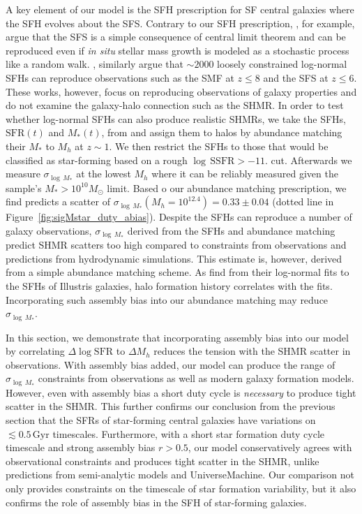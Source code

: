 \documentclass[12pt, letterpaper, preprint, tighten]{aastex62}
\newcommand{\logsfr}{\log\mathrm{SFR}}
\begin{document}
A key element of our model is the SFH prescription for SF central galaxies where 
the SFH evolves about the SFS. Contrary to our SFH prescription, \cite{kelson2014}, 
for example, argue that the SFS is a simple consequence of central limit theorem 
and can be reproduced even if \emph{in situ} stellar mass growth is modeled as 
a stochastic process like a random walk. \cite{gladders2013,abramson2015,abramson2016}, 
similarly argue that $\sim2000$ loosely constrained log-normal SFHs can reproduce 
observations such as the SMF at $z \leq 8$ and the SFS at $z \leq 6$. These works, 
however, focus on reproducing observations of galaxy properties and do not examine
the galaxy-halo connection such as the SHMR. In order to test whether log-normal 
SFHs can also produce realistic SHMRs, we take the SFHs, $\mathrm{SFR}(t)$ and 
$M_*(t)$, from \cite{abramson2016} and assign them to halos by abundance matching 
their $M_*$ to $M_h$ at $z{\sim}1$. We then restrict the SFHs to those that would 
be classified as star-forming based on a rough $\log\,\mathrm{SSFR} > -11.$ cut.
Afterwards we measure $\sigma_{\log\,M_*}$ at the lowest $M_h$ where it can be 
reliably measured given the \cite{abramson2016} sample's $M_*{>}10^{10}M_\odot$ 
limit. Based o our abundance matching prescription, we find \cite{abramson2016}
predicts a scatter of $\sigma_{\log\,M_*}(M_h=10^{12.4}) = 0.33\pm0.04$ (dotted 
line in Figure~\ref{fig:sigMstar_duty_abias}). Despite the \cite{abramson2016} SFHs 
can reproduce a number of galaxy observations, $\sigma_{\log\,M_*}$ derived from 
the SFHs and abundance matching predict SHMR scatters too high compared to 
constraints from observations and predictions from hydrodynamic simulations. 
This estimate is, however, derived from a simple abundance matching scheme. 
As \cite{diemer2017} find from their log-normal fits to the SFHs of Illustris 
galaxies, halo formation history correlates with the fits. Incorporating such 
assembly bias into our abundance matching may reduce $\sigma_{\log\,M_*}$.

In this section, we demonstrate that incorporating assembly bias into our model
by correlating $\Delta\logsfr$ to $\Delta M_h$ reduces the tension with the 
SHMR scatter in observations. With assembly bias added, our model can produce 
the range of $\sigma_{\log\,M_*}$ constraints from observations as well as 
modern galaxy formation models. However, even with assembly bias a short duty 
cycle is \emph{necessary} to produce tight scatter in the SHMR. This further 
confirms our conclusion from the previous section that the SFRs of star-forming 
central galaxies have variations on $\lesssim 0.5\,\mathrm{Gyr}$ timescales.
Furthermore, with a short star formation duty cycle timescale and strong 
assembly bias $r > 0.5$, our model conservatively agrees with observational 
constraints and produces tight scatter in the SHMR, unlike predictions from
semi-analytic models and {\sc UniverseMachine}. Our comparison not only provides 
constraints on the timescale of star formation variability, but it also confirms
the role of assembly bias in the SFH of star-forming galaxies.
\end{document}
